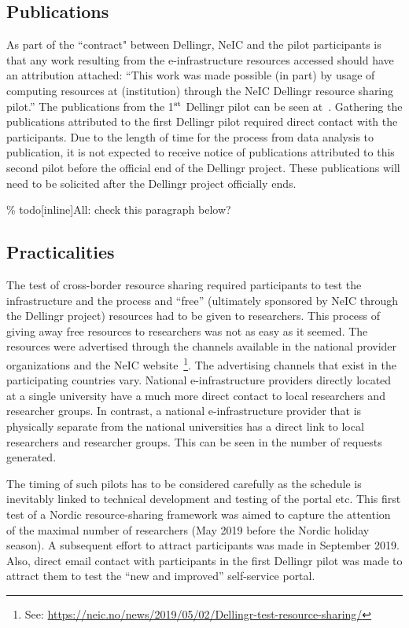 \documentclass{article}
\newcommand{\dell}{Dellingr\xspace}
\newcommand{\einfra}{e-infrastructure\xspace}
\newcommand{\np}{national provider\xspace}
\newcommand{\pilot}{first test of a Nordic resource-sharing framework\xspace}
\begin{document}
\subsection{Publications}

As part of the ``contract" between \dell, NeIC and the pilot participants is that any work resulting from the \einfra resources accessed should have an attribution attached: 
``This work was made possible (in part) by usage of computing resources at (institution) through the NeIC Dellingr resource sharing pilot.''
The publications from the 1$^{\rm st}$ \dell pilot can be seen at~\cite{pilot-pubs}.
Gathering the publications attributed to the first \dell pilot required direct contact with the participants.
Due to the length of time for the process from data analysis to publication, it is not expected to receive notice of publications attributed to this second pilot before the official end of the \dell project.
These publications will need to be solicited after the \dell project officially ends.

\% todo[inline]{All: check this paragraph below?}
\subsection{Practicalities}

The test of cross-border resource sharing required participants to test the infrastructure and the process
and ``free'' (ultimately sponsored by NeIC through the \dell project) resources had to be
given to researchers.
This process of giving away free resources to researchers was not as easy as it seemed.
The resources were advertised through the channels available in the \np organizations and the
NeIC website~\footnote{See: \url{https://neic.no/news/2019/05/02/Dellingr-test-resource-sharing/}}.
The advertising channels that exist in the participating countries vary.
National \einfra providers directly located at a single university have a much more direct contact to
local researchers and researcher groups.
In contrast, a national \einfra provider that is physically separate from the national universities has a
direct link to local researchers and researcher groups.
This can be seen in the number of requests generated.

The timing of such pilots has to be considered carefully as 
the schedule is inevitably linked to technical development and testing of the portal etc.
This \pilot was aimed to capture the attention of the maximal number of researchers (May 2019 before the Nordic holiday season).
A subsequent effort to attract participants was made in September 2019.
Also, direct email contact with participants in the first \dell pilot was made
to attract them to test the ``new and improved'' self-service portal.
\end{document}
